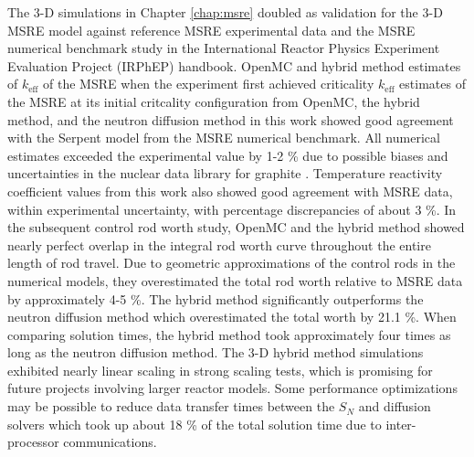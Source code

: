 The 3-D simulations in Chapter \ref{chap:msre} doubled as validation for the 3-D \gls{MSRE} model
against reference \gls{MSRE} experimental data and the \gls{MSRE} numerical benchmark study
\cite{fratoni_molten_2020} in
the International Reactor Physics Experiment Evaluation Project (IRPhEP) handbook. OpenMC and
hybrid method estimates of $k_\text{eff}$ of the \gls{MSRE} when the experiment first achieved criticality
$k_\text{eff}$ estimates of the \gls{MSRE} at its initial critcality configuration from OpenMC, the
hybrid method, and the neutron diffusion method in this work showed good agreement with the Serpent
model from the \gls{MSRE} numerical benchmark. All numerical estimates exceeded the experimental
value by 1-2 \% due to possible biases and uncertainties in the nuclear data library for graphite
\cite{fratoni_molten_2020}. Temperature reactivity coefficient values from this work also showed
good agreement with \gls{MSRE} data, within experimental uncertainty, with percentage discrepancies
of about 3 \%. In the subsequent control rod worth study, OpenMC and the hybrid method showed nearly
perfect overlap in the integral rod worth curve throughout the entire length of rod travel. Due to
geometric approximations of the control rods in the numerical models, they overestimated the total
rod worth relative to \gls{MSRE} data by approximately 4-5 \%. The hybrid method significantly
outperforms the neutron diffusion method which overestimated the total worth by 21.1 \%.
When comparing solution times, the hybrid method took approximately four times as long as the
neutron diffusion method.
The 3-D hybrid method simulations exhibited nearly linear scaling in strong scaling tests, which
is promising for future projects involving larger reactor models. Some performance optimizations
may be possible to reduce data transfer times between the $S_N$ and diffusion solvers which took
up about 18 \% of the total solution time due to inter-processor communications.

